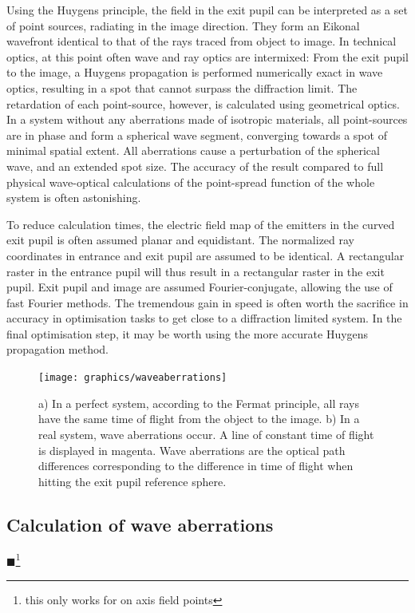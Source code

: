 \documentclass[12pt,a4paper,twoside,openright,BCOR10mm,headsepline,titlepage,abstracton,chapterprefix,final]{scrreprt}
\newcommand{\remark}[1]{{\color{red}$\blacksquare$}\footnote{{\color{red}#1}}}
\begin{document}
Using the Huygens principle, the field in the exit pupil can be interpreted as a set of point sources, radiating in the image direction. 
They form an Eikonal wavefront identical to that of the rays traced from object to image.
In technical optics, at this point often wave and ray optics are intermixed:
From the exit pupil to the image, a Huygens propagation is performed numerically exact in wave optics, resulting in a spot that cannot surpass the diffraction limit. 
The retardation of each point-source, however, is calculated using geometrical optics.
In a system without any aberrations made of isotropic materials, all point-sources are in phase and form a spherical wave segment, converging towards a spot of minimal spatial extent.
All aberrations cause a perturbation of the spherical wave, and an extended spot size.
The accuracy of the result compared to full physical wave-optical calculations of the point-spread function of the whole system is often astonishing. 

To reduce calculation times, the electric field map of the emitters in the curved exit pupil is often assumed planar and equidistant. 
The normalized ray coordinates in entrance and exit pupil are assumed to be identical.
A rectangular raster in the entrance pupil will thus result in a rectangular raster in the exit pupil.
Exit pupil and image are assumed Fourier-conjugate, allowing the use of fast Fourier methods.
The tremendous gain in speed is often worth the sacrifice in accuracy in optimisation tasks to get close to a diffraction limited system.
In the final optimisation step, it may be worth using the more accurate Huygens propagation method.

\begin{figure}
  \centering
   \texttt{[image: graphics/waveaberrations]}
  \caption{a) In a perfect system, according to the Fermat principle, all rays have the same time of flight from the object to the image. b) In a real system, wave aberrations occur. A line of constant time of flight is displayed in magenta.
  Wave aberrations are the optical path differences corresponding to the difference in time of flight when hitting the exit pupil reference sphere.}
  \label{fig:waveaberrations}
\end{figure}

\subsection{Calculation of wave aberrations}
\remark{this only works for on axis field points}
\end{document}
